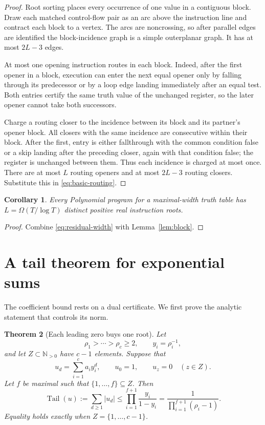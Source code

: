 \documentclass[11pt]{article}
\newtheorem{theorem}{Theorem}[section]
\newtheorem{corollary}[theorem]{Corollary}
\theoremstyle{definition}
\theoremstyle{remark}
\newcommand{\N}{\mathbb N}
\newcommand{\Tail}{\operatorname{Tail}}
\begin{document}
\begin{proof}
Root sorting places every occurrence of one value in a contiguous block.
Draw each matched control-flow pair as an arc above the instruction line and
contract each block to a vertex.  The arcs are noncrossing, so after parallel
edges are identified the block-incidence graph is a simple outerplanar graph.
It has at most $2L-3$ edges.

At most one opening instruction routes in each block.  Indeed, after the
first opener in a block, execution can enter the next equal opener only by
falling through its predecessor or by a loop edge landing immediately after
an equal test.  Both entries certify the same truth value of the unchanged
register, so the later opener cannot take both successors.

Charge a routing closer to the incidence between its block and its partner's
opener block.  All closers with the same incidence are consecutive within
their block.  After the first, entry is either fallthrough with the common
condition false or a skip landing after the preceding closer, again with that
condition false; the register is unchanged between them.  Thus each incidence
is charged at most once.  There are at most $L$ routing openers and at most
$2L-3$ routing closers.  Substitute this in
\eqref{eq:basic-routing}.
\end{proof}

\begin{corollary}\label{cor:roots}
Every Polynomial program for a maximal-width truth table has
$L=\Omega(T/\log T)$ distinct positive real instruction roots.
\end{corollary}

\begin{proof}
Combine \eqref{eq:residual-width} with Lemma~\ref{lem:block}.
\end{proof}

\section{A tail theorem for exponential sums}\label{sec:tail}

The coefficient bound rests on a dual certificate.  We first prove the
analytic statement that controls its norm.

\begin{theorem}[Each leading zero buys one root]\label{thm:tail}
Let
\[
  \rho_1>\cdots>\rho_c\ge2,
  \qquad y_i=\rho_i^{-1},
\]
and let $Z\subset\N_{>0}$ have $c-1$ elements.  Suppose that
\[
  u_d=\sum_{i=1}^{c}a_i y_i^d,
  \qquad u_0=1,
  \qquad u_z=0\quad(z\in Z).
\]
Let $f$ be maximal such that $\{1,\ldots,f\}\subseteq Z$.  Then
\begin{equation}\label{eq:tail-bound}
  \Tail(u):=\sum_{d\ge1}|u_d|
  \le \prod_{i=1}^{f+1}\frac{y_i}{1-y_i}
  =\frac{1}{\prod_{i=1}^{f+1}(\rho_i-1)}.
\end{equation}
Equality holds exactly when $Z=\{1,\ldots,c-1\}$.
\end{theorem}
\end{document}
